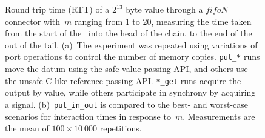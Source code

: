 \begin{figure}
{\begin{subfigure}[b]{0.63\textwidth}
			\caption{}
			\label{fig:fifo_m_1}
		\end{subfigure}%
	}
	\caption[RTT for fifoN connector with $2^{13}$ byte values.]{Round trip time (RTT) of a $2^{13}$ byte value through a $fifoN$ connector with~$m$ ranging from 1 to 20, measuring the time taken from the start of the~ into the head of the chain, to the end of the  out of the tail. (a)~The experiment was repeated using variations of port operations to control the number of memory copies. \texttt{put\_*} runs move the datum using the safe value-passing API, and others use the unsafe C-like reference-passing API. \texttt{*\_get} runs acquire the output by value, while others participate in synchrony by acquiring a signal. (b)~\texttt{put\_in\_out} is compared to the best- and worst-case scenarios for interaction times in response to~$m$. Measurements are the mean of $100\times{}10~000$ repetitions.}
	\label{fig:fifo_m}
\end{figure}
